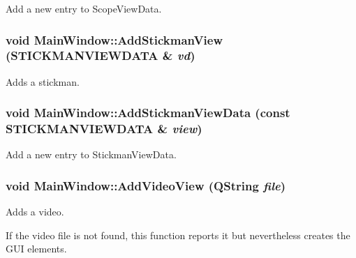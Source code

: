 Add a new entry to ScopeViewData. 

\hypertarget{class_main_window_b99b9d225edf064237e57bb35a654110}{
\subsubsection[{AddStickmanView}]{\setlength{\rightskip}{0pt plus 5cm}void MainWindow::AddStickmanView ({\bf STICKMANVIEWDATA} \& {\em vd})}}
\label{class_main_window_b99b9d225edf064237e57bb35a654110}


Adds a stickman. 

\hypertarget{class_main_window_52513bcfdf540f40b8b739bc7ac5110e}{
\subsubsection[{AddStickmanViewData}]{\setlength{\rightskip}{0pt plus 5cm}void MainWindow::AddStickmanViewData (const {\bf STICKMANVIEWDATA} \& {\em view})}}
\label{class_main_window_52513bcfdf540f40b8b739bc7ac5110e}


Add a new entry to StickmanViewData. 

\hypertarget{class_main_window_9eadd6d41f096191266165ed8544d966}{
\subsubsection[{AddVideoView}]{\setlength{\rightskip}{0pt plus 5cm}void MainWindow::AddVideoView (QString {\em file})}}
\label{class_main_window_9eadd6d41f096191266165ed8544d966}


Adds a video. 

If the video file is not found, this function reports it but nevertheless creates the GUI elements.


